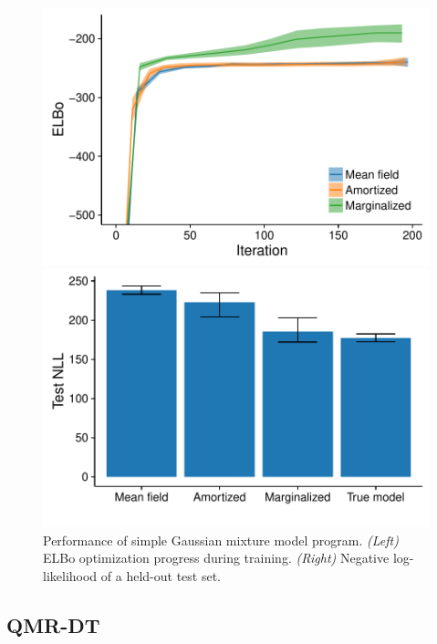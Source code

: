 \begin{figure}[!ht]
\begin{minipage}{0.5\linewidth}
\centering
\includegraphics[width=\linewidth]{figs/results/gmm/elboProgress.pdf}
\end{minipage}
%
\begin{minipage}{0.5\linewidth}
\centering
\includegraphics[width=\linewidth]{figs/results/gmm/nll.pdf}
\end{minipage}
\caption{Performance of simple Gaussian mixture model program. \emph{(Left)} ELBo optimization progress during training. \emph{(Right)} Negative log-likelihood of a held-out test set.}
\label{fig:gmmResults}
\end{figure}


\subsection{QMR-DT}
\label{sec:results_qmr}

